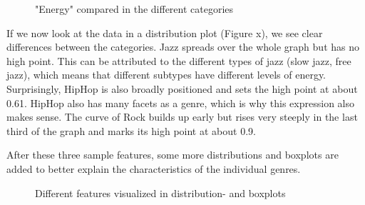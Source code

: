 \begin{figure}[H]
    \centering
    \qquad
    \caption{"Energy" compared in the different categories}%
    \label{du_dp_bp_enrg_categorie_dependent}%
\end{figure}

If we now look at the data in a distribution plot (Figure x),
we see clear differences between the categories.
Jazz spreads over the whole graph but has no high point.
This can be attributed to the different types of jazz (slow jazz, free jazz),
which means that different subtypes have different levels of energy.
Surprisingly, HipHop is also broadly positioned and sets the high point at about 0.61.
HipHop also has many facets as a genre, which is why this expression also makes sense.
The curve of Rock builds up early but rises very steeply in the last third of the graph and marks
its high point at about 0.9. 

After these three sample features, some more distributions and boxplots are added to better
explain the characteristics of the individual genres.

\begin{figure}[H]
    \centering
    \qquad
    \qquad
    \qquad
    \qquad
    \qquad
    \qquad
    \qquad
    \qquad
    \caption{Different features visualized in distribution- and boxplots}%
    \label{fig:du_ds_bp_comparison}%
\end{figure}